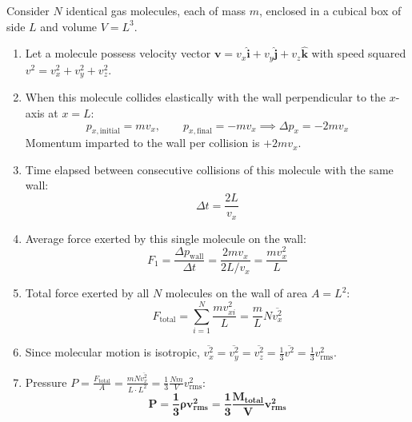 \documentclass[10pt,twoside,openright]{book}
\begin{document}
\begin{formulabox}[First-Principles Derivation of Ideal Gas Pressure: $P = \frac{1}{3}\rho v_{\text{rms}}^2$]
Consider $N$ identical gas molecules, each of mass $m$, enclosed in a cubical box of side $L$ and volume $V = L^3$.
\begin{enumerate}
  \item Let a molecule possess velocity vector $\mathbf{v} = v_x \hat{\mathbf{i}} + v_y \hat{\mathbf{j}} + v_z \hat{\mathbf{k}}$ with speed squared $v^2 = v_x^2 + v_y^2 + v_z^2$.
  \item When this molecule collides elastically with the wall perpendicular to the $x$-axis at $x = L$:
  \begin{equation}
    p_{x,\text{initial}} = m v_x, \qquad p_{x,\text{final}} = -m v_x \implies \Delta p_x = -2 m v_x
  \end{equation}
  Momentum imparted to the wall per collision is $+2 m v_x$.
  \item Time elapsed between consecutive collisions of this molecule with the same wall:
  \begin{equation}
    \Delta t = \frac{2 L}{v_x}
  \end{equation}
  \item Average force exerted by this single molecule on the wall:
  \begin{equation}
    F_1 = \frac{\Delta p_{\text{wall}}}{\Delta t} = \frac{2 m v_x}{2 L / v_x} = \frac{m v_x^2}{L}
  \end{equation}
  \item Total force exerted by all $N$ molecules on the wall of area $A = L^2$:
  \begin{equation}
    F_{\text{total}} = \sum_{i=1}^N \frac{m v_{xi}^2}{L} = \frac{m}{L} N \overline{v_x^2}
  \end{equation}
  \item Since molecular motion is isotropic, $\overline{v_x^2} = \overline{v_y^2} = \overline{v_z^2} = \frac{1}{3}\overline{v^2} = \frac{1}{3} v_{\text{rms}}^2$.
  \item Pressure $P = \frac{F_{\text{total}}}{A} = \frac{m N \overline{v_x^2}}{L \cdot L^2} = \frac{1}{3}\frac{N m}{V} v_{\text{rms}}^2$:
  \begin{equation}
    \mathbf{P = \frac{1}{3}\rho v_{\text{rms}}^2 = \frac{1}{3}\frac{M_{\text{total}}}{V} v_{\text{rms}}^2}
  \end{equation}
\end{enumerate}
\end{formulabox}
\end{document}
